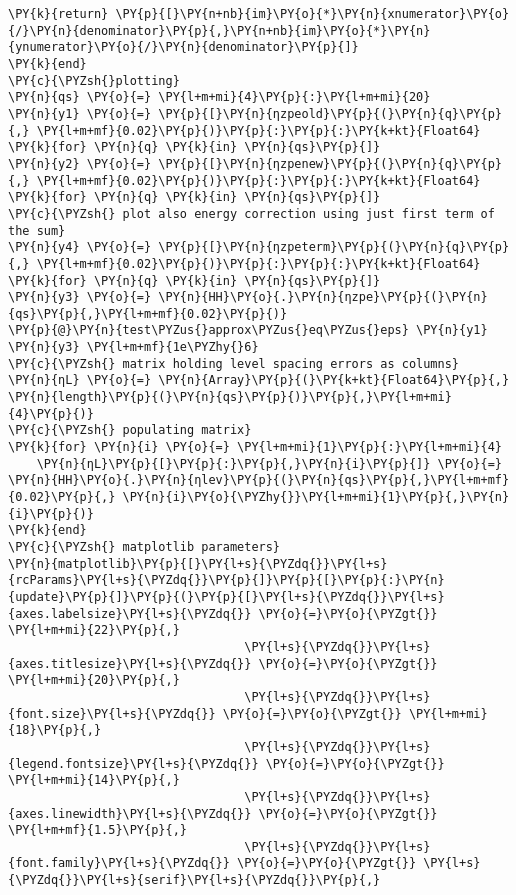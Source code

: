 \begin{Verbatim}[commandchars=\\\{\}]
    \PY{k}{return} \PY{p}{[}\PY{n+nb}{im}\PY{o}{*}\PY{n}{xnumerator}\PY{o}{/}\PY{n}{denominator}\PY{p}{,}\PY{n+nb}{im}\PY{o}{*}\PY{n}{ynumerator}\PY{o}{/}\PY{n}{denominator}\PY{p}{]}
\PY{k}{end}
\PY{c}{\PYZsh{}plotting}
\PY{n}{qs} \PY{o}{=} \PY{l+m+mi}{4}\PY{p}{:}\PY{l+m+mi}{20}
\PY{n}{y1} \PY{o}{=} \PY{p}{[}\PY{n}{ηzpeold}\PY{p}{(}\PY{n}{q}\PY{p}{,} \PY{l+m+mf}{0.02}\PY{p}{)}\PY{p}{:}\PY{p}{:}\PY{k+kt}{Float64} \PY{k}{for} \PY{n}{q} \PY{k}{in} \PY{n}{qs}\PY{p}{]}
\PY{n}{y2} \PY{o}{=} \PY{p}{[}\PY{n}{ηzpenew}\PY{p}{(}\PY{n}{q}\PY{p}{,} \PY{l+m+mf}{0.02}\PY{p}{)}\PY{p}{:}\PY{p}{:}\PY{k+kt}{Float64} \PY{k}{for} \PY{n}{q} \PY{k}{in} \PY{n}{qs}\PY{p}{]}
\PY{c}{\PYZsh{} plot also energy correction using just first term of the sum}
\PY{n}{y4} \PY{o}{=} \PY{p}{[}\PY{n}{ηzpeterm}\PY{p}{(}\PY{n}{q}\PY{p}{,} \PY{l+m+mf}{0.02}\PY{p}{)}\PY{p}{:}\PY{p}{:}\PY{k+kt}{Float64} \PY{k}{for} \PY{n}{q} \PY{k}{in} \PY{n}{qs}\PY{p}{]}
\PY{n}{y3} \PY{o}{=} \PY{n}{HH}\PY{o}{.}\PY{n}{ηzpe}\PY{p}{(}\PY{n}{qs}\PY{p}{,}\PY{l+m+mf}{0.02}\PY{p}{)}
\PY{p}{@}\PY{n}{test\PYZus{}approx\PYZus{}eq\PYZus{}eps} \PY{n}{y1} \PY{n}{y3} \PY{l+m+mf}{1e\PYZhy{}6}
\PY{c}{\PYZsh{} matrix holding level spacing errors as columns}
\PY{n}{ηL} \PY{o}{=} \PY{n}{Array}\PY{p}{(}\PY{k+kt}{Float64}\PY{p}{,} \PY{n}{length}\PY{p}{(}\PY{n}{qs}\PY{p}{)}\PY{p}{,}\PY{l+m+mi}{4}\PY{p}{)}
\PY{c}{\PYZsh{} populating matrix}
\PY{k}{for} \PY{n}{i} \PY{o}{=} \PY{l+m+mi}{1}\PY{p}{:}\PY{l+m+mi}{4}
    \PY{n}{ηL}\PY{p}{[}\PY{p}{:}\PY{p}{,}\PY{n}{i}\PY{p}{]} \PY{o}{=} \PY{n}{HH}\PY{o}{.}\PY{n}{ηlev}\PY{p}{(}\PY{n}{qs}\PY{p}{,}\PY{l+m+mf}{0.02}\PY{p}{,} \PY{n}{i}\PY{o}{\PYZhy{}}\PY{l+m+mi}{1}\PY{p}{,}\PY{n}{i}\PY{p}{)}
\PY{k}{end}
\PY{c}{\PYZsh{} matplotlib parameters}
\PY{n}{matplotlib}\PY{p}{[}\PY{l+s}{\PYZdq{}}\PY{l+s}{rcParams}\PY{l+s}{\PYZdq{}}\PY{p}{]}\PY{p}{[}\PY{p}{:}\PY{n}{update}\PY{p}{]}\PY{p}{(}\PY{p}{[}\PY{l+s}{\PYZdq{}}\PY{l+s}{axes.labelsize}\PY{l+s}{\PYZdq{}} \PY{o}{=}\PY{o}{\PYZgt{}} \PY{l+m+mi}{22}\PY{p}{,}
                                 \PY{l+s}{\PYZdq{}}\PY{l+s}{axes.titlesize}\PY{l+s}{\PYZdq{}} \PY{o}{=}\PY{o}{\PYZgt{}} \PY{l+m+mi}{20}\PY{p}{,}
                                 \PY{l+s}{\PYZdq{}}\PY{l+s}{font.size}\PY{l+s}{\PYZdq{}} \PY{o}{=}\PY{o}{\PYZgt{}} \PY{l+m+mi}{18}\PY{p}{,}
                                 \PY{l+s}{\PYZdq{}}\PY{l+s}{legend.fontsize}\PY{l+s}{\PYZdq{}} \PY{o}{=}\PY{o}{\PYZgt{}} \PY{l+m+mi}{14}\PY{p}{,}
                                 \PY{l+s}{\PYZdq{}}\PY{l+s}{axes.linewidth}\PY{l+s}{\PYZdq{}} \PY{o}{=}\PY{o}{\PYZgt{}} \PY{l+m+mf}{1.5}\PY{p}{,}
                                 \PY{l+s}{\PYZdq{}}\PY{l+s}{font.family}\PY{l+s}{\PYZdq{}} \PY{o}{=}\PY{o}{\PYZgt{}} \PY{l+s}{\PYZdq{}}\PY{l+s}{serif}\PY{l+s}{\PYZdq{}}\PY{p}{,}

\end{Verbatim}
